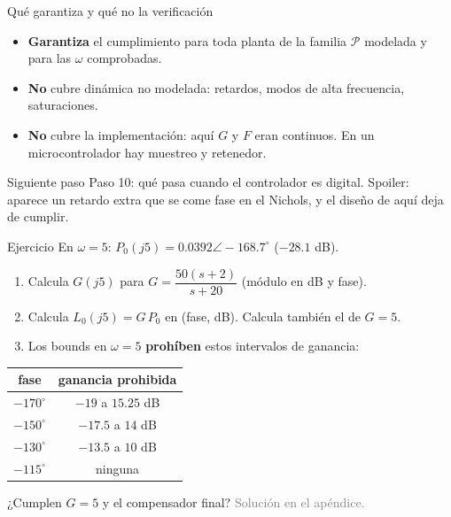 \documentclass[aspectratio=169,11pt]{beamer}
\begin{document}
\begin{frame}{Qué garantiza y qué no la verificación}
  \small
  \begin{itemize}
    \item \textbf{Garantiza} el cumplimiento para toda planta de la familia $\mathcal{P}$ modelada y para las $\omega$ comprobadas.
    \item \textbf{No} cubre dinámica no modelada: retardos, modos de alta frecuencia, saturaciones.
    \item \textbf{No} cubre la implementación: aquí $G$ y $F$ eran continuos. En un microcontrolador hay muestreo y retenedor.
  \end{itemize}
  \begin{alertblock}{Siguiente paso}
    Paso 10: qué pasa cuando el controlador es digital. Spoiler: aparece un retardo extra que se come fase en el Nichols, y el diseño de aquí deja de cumplir.
  \end{alertblock}
\end{frame}

\begin{frame}{Ejercicio}
  \small
  En $\omega=5$: $P_0(j5)=0.0392\angle-168.7^\circ$ ($-28.1$ dB).
  \begin{enumerate}
    \item Calcula $G(j5)$ para $G=\dfrac{50(s+2)}{s+20}$ (módulo en dB y fase).
    \item Calcula $L_0(j5)=G\,P_0$ en (fase, dB). Calcula también el de $G=5$.
    \item Los bounds en $\omega=5$ \textbf{prohíben} estos intervalos de ganancia:
  \end{enumerate}
  \begin{center}
  \begin{tabular}{c|c}
    fase & ganancia prohibida\\\hline
    $-170^\circ$ & $-19$ a $15.25$ dB\\
    $-150^\circ$ & $-17.5$ a $14$ dB\\
    $-130^\circ$ & $-13.5$ a $10$ dB\\
    $-115^\circ$ & ninguna
  \end{tabular}
  \end{center}
  ¿Cumplen $G=5$ y el compensador final? \textcolor{gray}{Solución en el apéndice.}
\end{frame}
\end{document}
